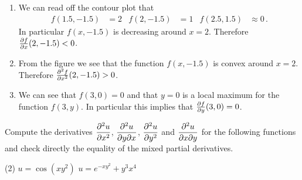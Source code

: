 \begin{solution}
\begin{enumerate}
\item
We can read off the contour plot that
\begin{align*}
f(1.5, -1.5) &= 2 &
f(2,-1.5) &= 1 &
f(2.5, 1.5) &\approx 0\,.
\end{align*}
In particular $f(x,-1.5)$ is decreasing around $x=2$. Therefore $\frac{\partial f}{\partial x}(2,-1.5) < 0$.

\item
From the figure we see that the function $f(x,-1.5)$ is convex around $x=2$. Therefore $\frac{\partial^2 f}{\partial x^2}(2,-1.5) > 0$.

\begin{center}
\end{center}

\item
We can see that $f(3,0) = 0$ and that $y=0$ is a local maximum for the function $f(3,y)$. In particular this implies that $\frac{\partial f}{\partial y}(3,0) = 0$.
\end{enumerate}
\end{solution}

\begin{question}
Compute the derivatives 
$\displaystyle\frac{\partial^2 u}{\partial x^2}$, 
$\displaystyle\frac{\partial^2 u}{\partial y \partial x}$, 
$\displaystyle\frac{\partial^2 u}{\partial y^2}$ and 
$\displaystyle\frac{\partial^2 u}{\partial x \partial y}$ for the following functions and check directly the equality of the mixed partial derivatives.
\begin{tasks}(2)
\task
$u = \cos(xy^2)$
\task
$u = e^{-xy^2} + y^3x^4$
\end{tasks}
\end{question}


